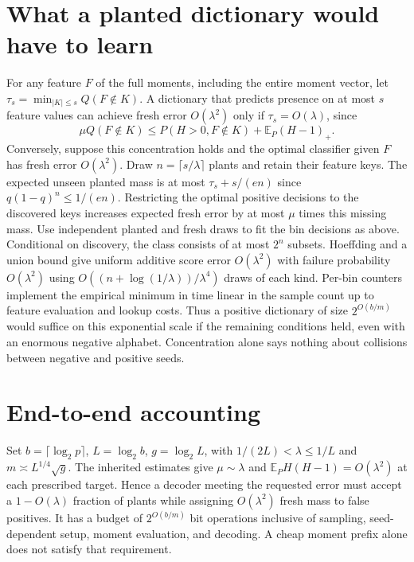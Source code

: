 \documentclass[11pt]{article}
\newcommand{\E}{\mathbb E}
\begin{document}
\section{What a planted dictionary would have to learn}
For any feature $F$ of the full moments, including the entire moment
vector, let $\tau_s=\min_{|K|\le s}Q(F\notin K)$. A dictionary that
predicts presence on at most $s$ feature values can achieve fresh error
$O(\lambda^2)$ only if $\tau_s=O(\lambda)$, since
\[
 \mu Q(F\notin K)\le P(H>0,F\notin K)+\E_P(H-1)_+ .
\]
Conversely, suppose this concentration holds and the optimal classifier
given $F$ has fresh error $O(\lambda^2)$. Draw $n=\lceil s/\lambda\rceil$
plants and retain their feature keys. The expected unseen planted mass is
at most $\tau_s+s/(en)$ since $q(1-q)^n\le1/(en)$. Restricting the optimal
positive decisions to the discovered keys increases expected fresh error
by at most $\mu$ times this missing mass. Use independent planted and
fresh draws to fit the bin decisions as above. Conditional on discovery,
the class consists of at most $2^n$ subsets. Hoeffding and a union bound
give uniform additive score error $O(\lambda^2)$ with failure probability
$O(\lambda^2)$ using $O((n+\log(1/\lambda))/\lambda^4)$ draws of each
kind. Per-bin counters implement the empirical minimum in time linear
in the sample count up to feature evaluation and lookup costs.
Thus a positive dictionary of size $2^{O(b/m)}$ would suffice on this
exponential scale if the remaining conditions held, even with an
enormous negative alphabet. Concentration alone says nothing about
collisions between negative and positive seeds.

\section{End-to-end accounting}
Set $b=\lceil\log_2p\rceil$, $L=\log_2b$, $g=\log_2 L$, with
$1/(2L)<\lambda\le1/L$ and $m\asymp L^{1/4}\sqrt g$. The inherited
estimates give $\mu\sim\lambda$ and $\E_P H(H-1)=O(\lambda^2)$ at
each prescribed target. Hence a decoder meeting the requested error
must accept a $1-O(\lambda)$ fraction of plants while assigning
$O(\lambda^2)$ fresh mass to false positives. It has a budget of
$2^{O(b/m)}$ bit operations inclusive of sampling, seed-dependent
setup, moment evaluation, and decoding. A cheap moment prefix alone
does not satisfy that requirement.
\end{document}
